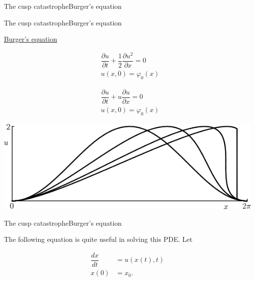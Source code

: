 \documentclass[aspectratio=169]{beamer}
\begin{document}
{\begin{frame}[t, c]{The cusp catastrophe}{\small Burger's equation}
    \vfill
  \end{frame}

  \begin{frame}[t, c]{The cusp catastrophe}{\small Burger's equation}
    \vfill
    \large

    \begin{minipage}{.48\textwidth}
      \centering

      \underline{Burger's equation}

      \begin{overprint}
        \[
        \begin{aligned}
          & \dfrac{\partial u}{\partial t} + \dfrac{1}{2} \dfrac{\partial u^2}{\partial x} = 0 \\
          & u(x, 0) = \varphi_0(x)
        \end{aligned}
        \]

        \[
        \begin{aligned}
          & \dfrac{\partial u}{\partial t} + u \dfrac{\partial u}{\partial x} = 0 \\
          & u(x, 0) = \varphi_0(x)
        \end{aligned}
        \]

      \end{overprint}
    \end{minipage}%
    \hfill
    \begin{minipage}{.48\textwidth}
      \centering
      \includegraphics[width=\textwidth]{burgers_profile}
    \end{minipage}

    \vfill
  \end{frame}

  \begin{frame}[t, c]{The cusp catastrophe}{\small Burger's equation}
    \vfill
    \large
    
    The following equation is quite useful in solving this PDE.
    Let
    
    
    \[
    \begin{aligned}
      \dfrac{dx}{dt} & = u(x(t), t) \\
      x(0) & = x_0.
    \end{aligned}
    \]
    

\end{frame}}
\end{document}
